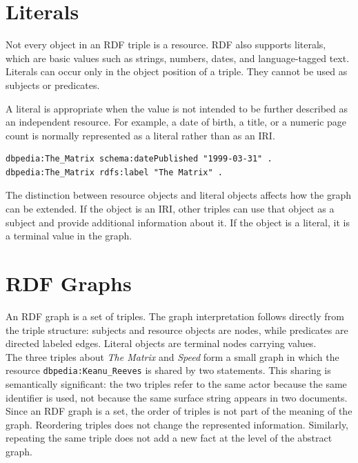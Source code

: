 \documentclass{scrbook}
\begin{document}
	\section{Literals}
	
	Not every object in an RDF triple is a resource. RDF also supports literals, which are basic values such as strings, numbers, dates, and language-tagged text. Literals can occur only in the object position of a triple. They cannot be used as subjects or predicates.
	
	A literal is appropriate when the value is not intended to be further described as an independent resource. For example, a date of birth, a title, or a numeric page count is normally represented as a literal rather than as an IRI.
	
	\begin{lstlisting}
dbpedia:The_Matrix schema:datePublished "1999-03-31" .
dbpedia:The_Matrix rdfs:label "The Matrix" .
	\end{lstlisting}
	
	The distinction between resource objects and literal objects affects how the graph can be extended. If the object is an IRI, other triples can use that object as a subject and provide additional information about it. If the object is a literal, it is a terminal value in the graph.
	
	\section{RDF Graphs}
	
	An RDF graph is a set of triples. The graph interpretation follows directly from the triple structure: subjects and resource objects are nodes, while predicates are directed labeled edges. Literal objects are terminal nodes carrying values.\\
	
	The three triples about \textit{The Matrix} and \textit{Speed} form a small graph in which the resource \texttt{dbpedia:Keanu\_Reeves} is shared by two statements. This sharing is semantically significant: the two triples refer to the same actor because the same identifier is used, not because the same surface string appears in two documents.\\
	
	Since an RDF graph is a set, the order of triples is not part of the meaning of the graph. Reordering triples does not change the represented information. Similarly, repeating the same triple does not add a new fact at the level of the abstract graph.\\
	
\end{document}
